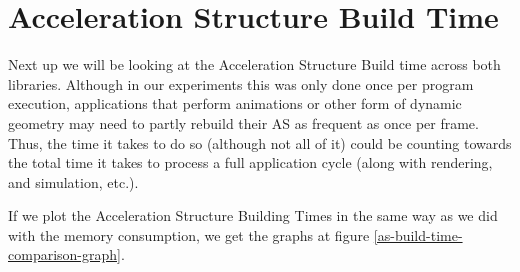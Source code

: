 \clearpage
\section{Acceleration Structure Build Time}
Next up we will be looking at the Acceleration Structure Build time across both libraries. Although in our experiments this was only done once per program execution, applications that perform animations or other form of dynamic geometry may need to partly rebuild their AS as frequent as once per frame. Thus, the time it takes to do so (although not all of it) could be counting towards the total time it takes to process a full application cycle (along with rendering, and simulation, etc.).

If we plot the Acceleration Structure Building Times in the same way as we did with the memory consumption, we get the graphs at figure \ref{as-build-time-comparison-graph}.

